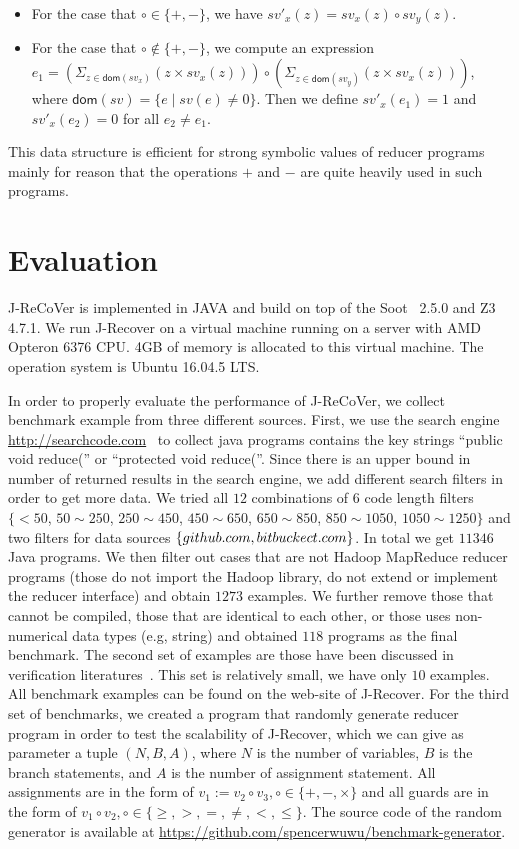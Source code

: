\documentclass{llncs}
\newcommand{\dom}[1]{\mathsf{dom}(#1)}
\begin{document}
\begin{itemize}
	\item For the case that $\circ \in\{+,-\}$, we have $sv'_x(z) = sv_x(z)\circ  sv_y(z)$. 
	\item For the case that $\circ \notin\{+,-\}$, we compute an expression $e_1= (\Sigma_{z\in \dom{sv_x}} (z\times sv_x(z)) )\circ (\Sigma_{z\in \dom{sv_y}} (z\times sv_x(z)))$, where $\dom{sv}=\{e\mid sv(e)\neq 0\}$. Then we define $sv'_x(e_1) =1$ and $sv'_x(e_2) = 0$ for all $e_2\neq e_1$. 
\end{itemize}

This data structure is efficient for strong symbolic values of reducer programs mainly for reason that the operations $+$ and $-$ are quite heavily used in such programs. 



\section{Evaluation}
\label{section:exp}
J-ReCoVer is implemented in JAVA and build on top of the Soot~\cite{soot} 2.5.0 and Z3~\cite{z3} 4.7.1. We run J-Recover on a virtual machine running on a server with AMD Opteron 6376 CPU. 4GB of memory is allocated to this virtual machine. The operation system is Ubuntu 16.04.5 LTS. 


 In order to properly evaluate the performance of J-ReCoVer, we collect benchmark example from three different sources. 
First, we use the search engine \url{http://searchcode.com}~\cite{searchcode} to collect java programs contains the key strings ``public void reduce('' or ``protected void reduce(''.  Since there is an upper bound in number of returned results in the search engine, we add different search filters in order to get more data. We tried all $12$ combinations of $6$ code length filters $\{<50$, $ 50\sim 250$, $250\sim 450$, $450\sim 650$, $650\sim 850$, $850\sim 1050$, $1050\sim 1250\}$ 
and two filters for data sources $\{github.com, bitbuckect.com\}$. In total we get $11346$ Java programs. We then filter out cases that are not Hadoop MapReduce reducer programs (those do not import the Hadoop library, do not extend or implement the reducer interface) and obtain $1273$ examples. We further remove those that cannot be compiled, those that are identical to each other, or those uses non-numerical data types (e.g, string) and obtained $118$ programs as the final benchmark.
The second set of examples are those have been discussed in verification literatures~\cite{ChenHSW15,ChenSW16,SmithA16}. This set is relatively small, we have only $10$ examples. All benchmark examples can be found on the web-site of J-Recover.
For the third set of benchmarks, we created a program that randomly generate reducer program in order to test the scalability of J-Recover, which we can give as parameter a tuple $(N,B,A)$, where $N$ is the number of variables, $B$ is the branch statements, and $A$ is the number of assignment statement. All assignments are in the form of $v_1 := v_2\circ v_3,\circ\in\{+,-,\times\}$ and all guards are in the form of $v_1 \circ v_2, \circ\in\{\geq, >,=, \neq, <,\leq \}$.
 The source code of the random generator is available at \url{https://github.com/spencerwuwu/benchmark-generator}.
\end{document}
